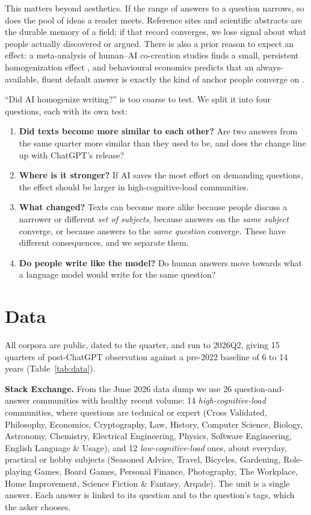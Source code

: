 \documentclass[11pt]{article}
\begin{document}
This matters beyond aesthetics. If the range of answers to a question narrows, so does the pool of
ideas a reader meets. Reference sites and scientific abstracts are the durable memory of a field; if
that record converges, we lose signal about what people actually discovered or argued. There is also
a prior reason to expect an effect: a meta-analysis of human--AI co-creation studies finds a small,
persistent homogenization effect \citep{derooij2026}, and behavioural economics predicts that an
always-available, fluent default answer is exactly the kind of anchor people converge on
\citep{samuelson1988}.

``Did AI homogenize writing?'' is too coarse to test. We split it into four questions, each with its
own test:
\begin{enumerate}
  \item \textbf{Did texts become more similar to each other?} Are two answers from the same quarter
  more similar than they used to be, and does the change line up with ChatGPT's release?
  \item \textbf{Where is it stronger?} If AI saves the most effort on demanding questions, the effect
  should be larger in high-cognitive-load communities.
  \item \textbf{What changed?} Texts can become more alike because people discuss a narrower or
  different \emph{set of subjects}, because answers on the \emph{same subject} converge, or because
  answers to the \emph{same question} converge. These have different consequences, and we separate them.
  \item \textbf{Do people write like the model?} Do human answers move towards what a language model
  would write for the same question?
\end{enumerate}

\section{Data}

All corpora are public, dated to the quarter, and run to 2026Q2, giving 15 quarters of
post-ChatGPT observation against a pre-2022 baseline of 6 to 14 years (Table~\ref{tab:data}).

\textbf{Stack Exchange.} From the June 2026 data dump we use 26 question-and-answer communities with
healthy recent volume: 14 \emph{high-cognitive-load} communities, where questions are technical or
expert (Cross Validated, Philosophy, Economics, Cryptography, Law, History, Computer Science,
Biology, Astronomy, Chemistry, Electrical Engineering, Physics, Software Engineering, English
Language \& Usage), and 12 \emph{low-cognitive-load} ones, about everyday, practical or hobby
subjects (Seasoned Advice, Travel, Bicycles, Gardening, Role-playing Games, Board Games, Personal
Finance, Photography, The Workplace, Home Improvement, Science Fiction \& Fantasy, Arqade). The unit
is a single answer. Each answer is linked to its question and to the question's tags, which the
asker chooses.
\end{document}
